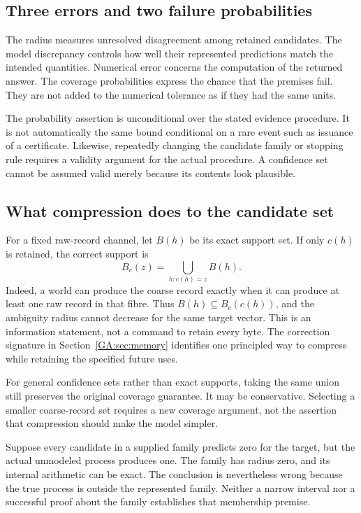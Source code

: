 \subsection{Three errors and two failure probabilities}
The radius measures unresolved disagreement among retained candidates. The model discrepancy controls how well their represented predictions match the intended quantities. Numerical error concerns the computation of the returned answer. The coverage probabilities express the chance that the premises fail. They are not added to the numerical tolerance as if they had the same units.

The probability assertion is unconditional over the stated evidence procedure. It is not automatically the same bound conditional on a rare event such as issuance of a certificate. Likewise, repeatedly changing the candidate family or stopping rule requires a validity argument for the actual procedure. A confidence set cannot be assumed valid merely because its contents look plausible.

\subsection{What compression does to the candidate set}
For a fixed raw-record channel, let $B(h)$ be its exact support set. If only $c(h)$ is retained, the correct support is
\[
B_c(z)=\bigcup_{h:c(h)=z}B(h).
\]
Indeed, a world can produce the coarse record exactly when it can produce at least one raw record in that fibre. Thus $B(h)\subseteq B_c(c(h))$, and the ambiguity radius cannot decrease for the same target vector. This is an information statement, not a command to retain every byte. The correction signature in Section~\ref{GA:sec:memory} identifies one principled way to compress while retaining the specified future uses.

For general confidence sets rather than exact supports, taking the same union still preserves the original coverage guarantee. It may be conservative. Selecting a smaller coarse-record set requires a new coverage argument, not the assertion that compression should make the model simpler.

\begin{GAcounterexample}\label{GA:ce:misspec}
Suppose every candidate in a supplied family predicts zero for the target, but the actual unmodeled process produces one. The family has radius zero, and its internal arithmetic can be exact. The conclusion is nevertheless wrong because the true process is outside the represented family. Neither a narrow interval nor a successful proof about the family establishes that membership premise.
\end{GAcounterexample}

